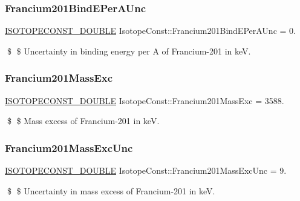 \subsubsection{\texorpdfstring{Francium201\+Bind\+E\+Per\+A\+Unc}{Francium201BindEPerAUnc}}
{\footnotesize\ttfamily \mbox{\hyperlink{group___isotope_const-_macros_ga8f45a7272ce02c0b4c65c44636ed719a}{I\+S\+O\+T\+O\+P\+E\+C\+O\+N\+S\+T\+\_\+\+D\+O\+U\+B\+LE}} Isotope\+Const\+::\+Francium201\+Bind\+E\+Per\+A\+Unc = 0.}

\$ \$ Uncertainty in binding energy per A of Francium-\/201 in keV. \mbox{\label{group___isotope_const-_francium-_fr201_gae5bbffb6d05b4e87c7d522e3156b79f5}} 
\subsubsection{\texorpdfstring{Francium201\+Mass\+Exc}{Francium201MassExc}}
{\footnotesize\ttfamily \mbox{\hyperlink{group___isotope_const-_macros_ga8f45a7272ce02c0b4c65c44636ed719a}{I\+S\+O\+T\+O\+P\+E\+C\+O\+N\+S\+T\+\_\+\+D\+O\+U\+B\+LE}} Isotope\+Const\+::\+Francium201\+Mass\+Exc = 3588.}

\$ \$ Mass excess of Francium-\/201 in keV. \mbox{\label{group___isotope_const-_francium-_fr201_ga0cddde255673679e5829d30cd3dc9c80}} 
\subsubsection{\texorpdfstring{Francium201\+Mass\+Exc\+Unc}{Francium201MassExcUnc}}
{\footnotesize\ttfamily \mbox{\hyperlink{group___isotope_const-_macros_ga8f45a7272ce02c0b4c65c44636ed719a}{I\+S\+O\+T\+O\+P\+E\+C\+O\+N\+S\+T\+\_\+\+D\+O\+U\+B\+LE}} Isotope\+Const\+::\+Francium201\+Mass\+Exc\+Unc = 9.}

\$ \$ Uncertainty in mass excess of Francium-\/201 in keV. \mbox{\label{group___isotope_const-_francium-_fr201_ga380da91c6e52a0ac8e2b1dd6a236fa5c}} 
